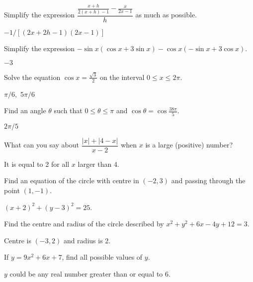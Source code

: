 \begin{enumialphparenastyle}
\begin{ex}
Simplify the expression $\dfrac{\frac{x+h}{2(x+h)-1}-\frac{x}{2x-1}}{h}$ as much as possible.
\begin{sol}
	$-1/\left[(2x+2h-1)(2x-1)\right]$
\end{sol}
\end{ex}

\begin{ex}
Simplify the expression $-\sin x(\cos x+3\sin x)-\cos x(-\sin x+3\cos x)$.
\begin{sol}
	$-3$
\end{sol}
\end{ex}

\begin{ex}
Solve the equation $\cos x=\frac{\sqrt{3}}{2}$ on
the interval $0\leq x\leq 2\pi$.
\begin{sol}
	$\pi /6,$ $5\pi /6$
\end{sol}
\end{ex}

\begin{ex}
Find an angle $\theta$ such that $0\leq\theta\leq\pi$ and $\cos\theta=\cos\frac{38\pi}{5}$.
\begin{sol}
	$2\pi/5$
\end{sol}
\end{ex}

\begin{ex}
What can you say about $\dfrac{\left\vert x\right\vert+\left\vert 4-x\right\vert}{x-2}$ when $x$ is a large
(positive) number?
\begin{sol}
	It is equal to 2 for all $x$ larger than 4.
\end{sol}
\end{ex}

\begin{ex}
Find an equation of the circle with centre in $(-2,3)$ and passing through the point $(1,-1)$.
\begin{sol}
	$(x+2)^2+(y-3)^2=25$.
\end{sol}
\end{ex}

\begin{ex}
Find the centre and radius of the circle described
by $x^2+y^2+6x-4y+12=3$.
\begin{sol}
	Centre is $(-3,2)$ and radius is 2.
\end{sol}
\end{ex}

\begin{ex}
If $y=9x^2+6x+7$, find all possible values of $y$.
\begin{sol}
	$y$ could be any real number greater than or equal to 6.
\end{sol}
\end{ex}


\end{enumialphparenastyle}
